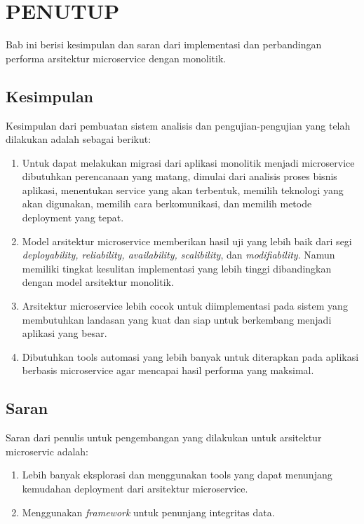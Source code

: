 \chapter{PENUTUP}

%
\vspace{4.5pt}
Bab ini berisi kesimpulan dan saran dari implementasi dan perbandingan performa arsitektur microservice dengan monolitik.
\section{Kesimpulan}
Kesimpulan dari pembuatan sistem analisis dan 
pengujian-pengujian yang telah dilakukan adalah sebagai berikut:
\begin{enumerate}
	\item Untuk dapat melakukan migrasi dari aplikasi monolitik menjadi microservice dibutuhkan perencanaan yang matang, dimulai dari analisis proses bisnis aplikasi, menentukan service yang akan terbentuk, memilih teknologi yang akan digunakan, memilih cara berkomunikasi, dan memilih metode deployment yang tepat.
	\item Model arsitektur microservice memberikan hasil uji yang lebih baik dari segi \textit{deployability, reliability, availability, scalibility}, dan \textit{modifiability}. Namun memiliki tingkat kesulitan implementasi yang lebih tinggi dibandingkan dengan model arsitektur monolitik.
	\item Arsitektur microservice lebih cocok untuk diimplementasi  pada sistem yang membutuhkan landasan yang kuat dan siap untuk berkembang menjadi aplikasi yang besar.
	\item Dibutuhkan tools automasi yang lebih banyak untuk diterapkan pada aplikasi berbasis microservice agar mencapai hasil performa yang maksimal.
\end{enumerate}
\section{Saran}
Saran dari penulis untuk pengembangan yang dilakukan untuk arsitektur microservic adalah:
\begin{enumerate}
	\item Lebih banyak eksplorasi dan menggunakan tools yang dapat menunjang kemudahan deployment dari arsitektur microservice.
	\item Menggunakan \textit{framework} untuk penunjang integritas data.
\end{enumerate}
\newpage